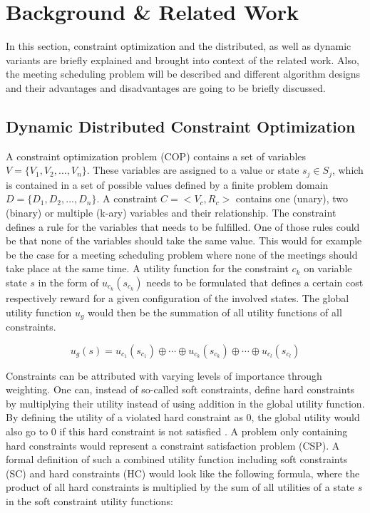 \chapter{Background \& Related Work}
\label{chap:background}

In this section, constraint optimization and the distributed, as well as dynamic variants are briefly explained and brought into context of the related work. Also, the meeting scheduling problem will be described and different algorithm designs and their advantages and disadvantages are going to be briefly discussed.
    
\section{Dynamic Distributed Constraint Optimization}

    
A constraint optimization problem (COP) contains a set of variables \(V=\{V_{1},V_{2}, ...,  V_{n}\}\). These variables are assigned to a value or state \(s_{j} \in S_{j}\), which is contained in a set of possible values defined by a finite problem domain \(D=\{D_{1},D_{2}, ...,  D_{n}\}\). A constraint \(C = <V_{c}, R_{c}>\) contains one (unary), two (binary) or multiple (k-ary) variables and their relationship. The constraint defines a rule for the variables that needs to be fulfilled. One of those rules could be that none of the variables should take the same value. This would for example be the case for a meeting scheduling problem where none of the meetings should take place at the same time. \newline
A utility function for the constraint \({c}_{k}\) on variable state \(s\) in the form of \(u_{{c}_{k}}(s_{{c}_{k}})\) needs to be formulated that defines a certain cost respectively reward for a given configuration of the involved states. The global utility function \(u_{g}\) would then be the summation of all utility functions of all constraints. 

\[u_{g}(s) = u_{c_{1}}(s_{c_{1}}) \oplus \cdots \oplus u_{c_{k}}(s_{c_{k}}) \oplus \cdots \oplus u_{c_{l}}(s_{c_{l}}) \] 

Constraints can be attributed with varying levels of importance through weighting. One can, instead of so-called soft constraints, define hard constraints by multiplying their utility instead of using addition in the global utility function. By defining the utility of a violated hard constraint as 0, the global utility would also go to 0 if this hard constraint is not satisfied \cite{Chapman2011, Petcu2003}. A problem only containing hard constraints would represent a constraint satisfaction problem (CSP). A formal definition of such a combined utility function including soft constraints (SC) and hard constraints (HC) would look like the following formula, where the product of all hard constraints is multiplied by the sum of all utilities of a state \(s\) in the soft constraint utility functions:

